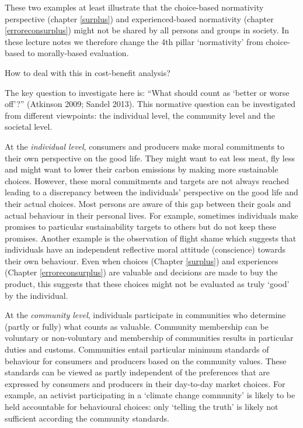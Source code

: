 \documentclass[
]{book}
\begin{document}
These two examples at least illustrate that the choice-based normativity perspective (chapter \ref{surplus}) and experienced-based normativity (chapter \ref{erroreconsurplus}) might not be shared by all persons and groups in society. In these lecture notes we therefore change the 4th pillar `normativity' from choice-based to morally-based evaluation.

How to deal with this in cost-benefit analysis?

The key question to investigate here is: ``What should count as `better or worse off'?'' (Atkinson 2009; Sandel 2013). This normative question can be investigated from different viewpoints: the individual level, the community level and the societal level.

At the \emph{individual level}, consumers and producers make moral commitments to their own perspective on the good life. They might want to eat less meat, fly less and might want to lower their carbon emissions by making more sustainable choices. However, these moral commitments and targets are not always reached leading to a discrepancy between the individuals' perspective on the good life and their actual choices. Most persons are aware of this gap between their goals and actual behaviour in their personal lives. For example, sometimes individuals make promises to particular sustainability targets to others but do not keep these promises. Another example is the observation of flight shame which suggests that individuals have an independent reflective moral attitude (conscience) towards their own behaviour. Even when choices (Chapter \ref{surplus}) and experiences (Chapter \ref{erroreconsurplus}) are valuable and decisions are made to buy the product, this suggests that these choices might not be evaluated as truly `good' by the individual.

At the \emph{community level}, individuals participate in communities who determine (partly or fully) what counts as valuable. Community membership can be voluntary or non-voluntary and membership of communities results in particular duties and customs. Communities entail particular minimum standards of behaviour for consumers and producers based on the community values. These standards can be viewed as partly independent of the preferences that are expressed by consumers and producers in their day-to-day market choices. For example, an activist participating in a `climate change community' is likely to be held accountable for behavioural choices: only `telling the truth' is likely not sufficient according the community standards.
\end{document}
